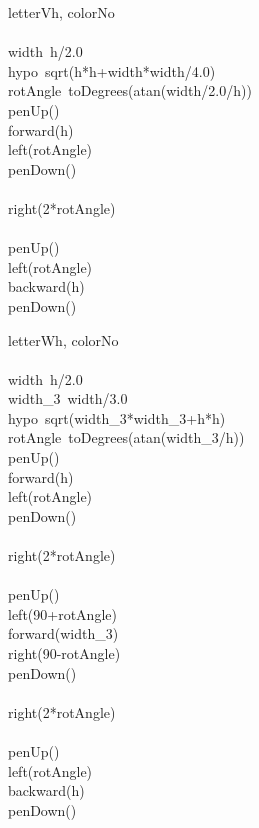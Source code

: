 \documentclass[a4paper,10pt]{article}
\begin{document}
\begin{pseudocode}{letterV}{h, colorNo }
\label{letterV}
\\
\\
  width\gets\ h/2.0\\
  hypo\gets\ sqrt(h*h+width*width/4.0)\\
  rotAngle\gets\ toDegrees(atan(width/2.0/h))\\
  penUp()\\
  forward(h)\\
  left(rotAngle)\\
  penDown()\\
  \\
  right(2*rotAngle)\\
  \\
  penUp()\\
  left(rotAngle)\\
  backward(h)\\
  penDown()\\
\ENDPROCEDURE
\end{pseudocode}


\begin{pseudocode}{letterW}{h, colorNo }
\label{letterW}
\\
\\
  width\gets\ h/2.0\\
  width\_3\gets\ width/3.0\\
  hypo\gets\ sqrt(width\_3*width\_3+h*h)\\
  rotAngle\gets\ toDegrees(atan(width\_3/h))\\
  penUp()\\
  forward(h)\\
  left(rotAngle)\\
  penDown()\\
  \\
  right(2*rotAngle)\\
  \\
  penUp()\\
  left(90+rotAngle)\\
  forward(width\_3)\\
  right(90-rotAngle)\\
  penDown()\\
  \\
  right(2*rotAngle)\\
  \\
  penUp()\\
  left(rotAngle)\\
  backward(h)\\
  penDown()\\
\ENDPROCEDURE
\end{pseudocode}
\end{document}
